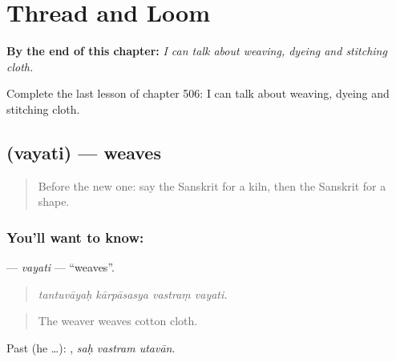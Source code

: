 
\chapter{Thread and Loom}
\label{ch:sa-thread-and-loom}

\begin{chapteropening}
\textbf{By the end of this chapter:} \emph{I can talk about weaving, dyeing and stitching cloth.}

Complete the last lesson of chapter 506: I can talk about weaving, dyeing and stitching cloth.
\end{chapteropening}

\section[\texorpdfstring{\sk{वयति} (vayati)}{वयति (vayati)}]{ (vayati) — weaves}

\label{lesson:SA-C506-vayati}



\begin{quote}
Before the new one: say the Sanskrit for a kiln, then the Sanskrit for a shape.
\end{quote}

\subsection*{You'll want to know: }
\textbf{} — \emph{vayati} — \textquotedblleft{}weaves\textquotedblright{}.

\begin{quote}
   
\end{quote}

\begin{quote}
\emph{tantuvāyaḥ kārpāsasya vastraṃ vayati.}
\end{quote}

\begin{quote}
The weaver weaves cotton cloth.
\end{quote}

Past (he …):   , \emph{saḥ vastram utavān}.

